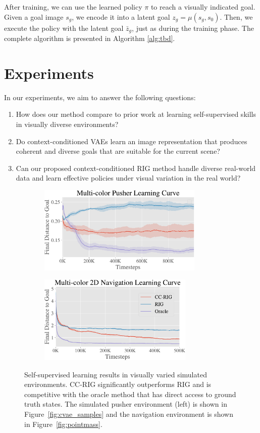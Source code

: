 After training, we can use the learned policy $\pi$ to reach a visually indicated goal.
Given a goal image $s_g$, we encode it into a latent goal $z_g = \mu(s_g, s_0)$.
Then, we execute the policy with the latent goal $\bar{z}_g$, just as during the training phase.
The complete algorithm is presented in Algorithm \ref{alg:tbd}.

\section{Experiments}

In our experiments, we aim to answer the following questions:
\begin{enumerate}
    \item How does our method compare to prior work at learning self-supervised skills in visually diverse environments?
    \item Do context-conditioned VAEs learn an image representation that produces coherent and diverse goals that are suitable for the current scene?
    \item Can our proposed context-conditioned RIG method handle diverse real-world data and learn effective policies under visual variation in the real world?
\end{enumerate}

\begin{figure}[ht!]
    \centering
    \begin{subfigure}[b]{0.48\textwidth}
        \center
        \includegraphics[height=4.2cm]{ccrig/img/final_pusher3-crop.pdf}
    \end{subfigure}
    \hspace{0.3cm}
    \begin{subfigure}[b]{0.48\textwidth}
        \includegraphics[height=4.2cm]{ccrig/img/final_pointmass1-crop.pdf}
    \end{subfigure}
    \caption{Self-supervised learning results in visually varied simulated environments. CC-RIG significantly outperforms RIG and is competitive with the oracle method that has direct access to ground truth states. The simulated pusher environment (left) is shown in Figure~\ref{fig:cvae_samples} and the navigation environment is shown in Figure~\ref{fig:pointmass}.}
    \vspace{-0.2in}
    \label{fig:sim-learning-curves}
\end{figure}

